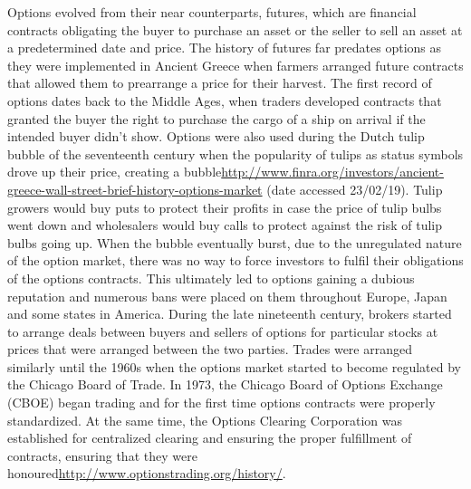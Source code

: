 Options evolved from their near counterparts, futures, which are financial contracts obligating the buyer to purchase an asset or the seller to sell an asset at a predetermined date and price. The history of futures far predates options as they were implemented in Ancient Greece when farmers arranged future contracts that allowed them to prearrange a price for their harvest. 
\nline
The first record of options dates back to the Middle Ages, when traders developed contracts that granted the buyer the right to purchase the cargo of a ship on arrival if the intended buyer didn't show. Options were also used during the Dutch tulip bubble of the seventeenth century when the popularity of tulips as status symbols drove up their price, creating a bubble\url{http://www.finra.org/investors/ancient-greece-wall-street-brief-history-options-market} (date accessed 23/02/19). Tulip growers would buy puts to protect their profits in case the price of tulip bulbs went down and wholesalers would buy calls to protect against the risk of tulip bulbs going up. When the bubble eventually burst, due to the unregulated nature of the option market, there was no way to force investors to fulfil their obligations of the options contracts. This ultimately led to options gaining a dubious reputation and numerous bans were placed on them throughout Europe, Japan and some states in America. 
\nline
During the late nineteenth century, brokers started to arrange deals between buyers and sellers of options for particular stocks at prices that were arranged between the two parties. Trades were arranged similarly until the 1960s when the options market started to become regulated by the Chicago Board of Trade. In 1973, the Chicago Board of Options Exchange (CBOE) began trading and for the first time options contracts were properly standardized. At the same time, the Options Clearing Corporation was established for centralized clearing and ensuring the proper fulfillment of contracts, ensuring that they were honoured\url{http://www.optionstrading.org/history/}.


